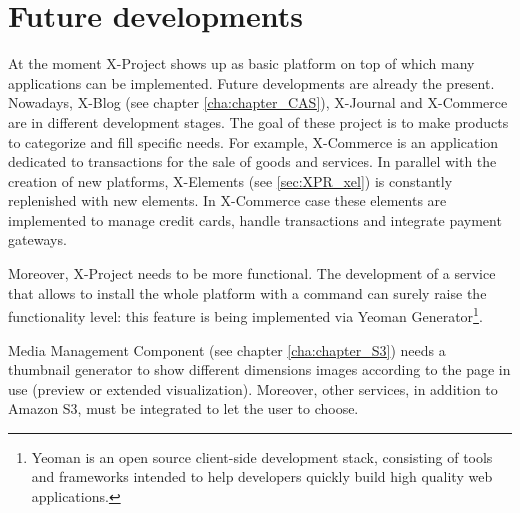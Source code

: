 \section{Future developments}
\label{sec:conclusions_future_developments}

At the moment X-Project shows up as basic platform on top of which many applications can be implemented. Future developments are already the present. Nowadays, X-Blog (see chapter \ref{cha:chapter_CAS}), X-Journal and X-Commerce are in different development stages. The goal of these project is to make products to categorize and fill specific needs. For example, X-Commerce is an application dedicated to transactions for the sale of goods and services. In parallel with the creation of new platforms, X-Elements (see \ref{sec:XPR_xel}) is constantly replenished with new elements.
In X-Commerce case these elements are implemented to manage credit cards, handle transactions and integrate payment gateways.

Moreover, X-Project needs to be more functional. The development of a service that allows to install the whole platform with a command can surely raise the functionality level: this feature is being implemented via Yeoman Generator\footnote{Yeoman is an open source client-side development stack, consisting of tools and frameworks intended to help developers quickly build high quality web applications.}.

Media Management Component (see chapter \ref{cha:chapter_S3}) needs a thumbnail generator to show different dimensions images according to the page in use (preview or extended visualization). Moreover, other services, in addition to Amazon S3, must be integrated to let the user to choose.
